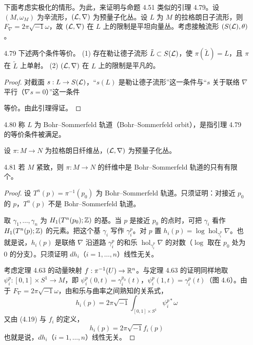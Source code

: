 下面考虑实极化的情形。为此，来证明与命题 4.51 类似的引理 4.79。设 $(M,\omega_M)$ 为辛流形，$(\mathcal{L},\nabla)$ 为预量子化丛。设 $L$ 为 $M$ 的拉格朗日子流形，则 $F_\nabla=2\pi\sqrt{-1}\omega$，故 $(\mathcal{L},\nabla)$ 在 $L$ 上的限制是平坦向量丛。考虑接触流形 $(S(\mathcal{L}),\theta)$。

\begin{lemma*}{4.79}
  下述两个条件等价。
  (1) 存在勒让德子流形 $\tilde L\subset S(\mathcal{L})$，使 $\pi(\tilde L)=L$，且 $\pi$ 在 $\tilde L$ 上单射。
  (2) $(\mathcal{L},\nabla)$ 在 $L$ 上的限制是平凡的。
\end{lemma*}

\begin{proof}
  对截面 $s:L\to S(\mathcal{L})$，“$s(L)$ 是勒让德子流形”这一条件与“$s$ 关于联络 $\nabla$ 平行（$\nabla s=0$）”这一条件

  等价。由此引理得证。
\end{proof}

\begin{definition}{4.80}
  称 $L$ 为 Bohr–Sommerfeld 轨道（Bohr–Sommerfeld orbit），是指引理 4.79 的等价条件被满足。
\end{definition}

设 $\pi:M\to N$ 为拉格朗日纤维丛，$(\mathcal{L},\nabla)$ 为预量子化丛。

\begin{lemma*}{4.81}
  若 $M$ 紧致，则 $\pi:M\to N$ 的纤维中是 Bohr–Sommerfeld 轨道的只有有限个。
\end{lemma*}

\begin{proof}
  设 $T^n(p)=\pi^{-1}(p_0)$ 为 Bohr–Sommerfeld 轨道。只须证明：对接近 $p_0$ 的 $p$，$T^n(p)$ 不是 Bohr–Sommerfeld 轨道。

  取 $\gamma_1,\dots,\gamma_n$ 为 $H_1(T^n(p_0);\mathbb{Z})$ 的基。当 $p$ 是接近 $p_0$ 的点时，可把 $\gamma_i$ 看作 $H_1(T^n(p);\mathbb{Z})$ 的元素。把这个基 $\gamma_i$ 写作 $\gamma^p_i$。对 $p$ 置 $h_i(p)=\log\operatorname{hol}_{\gamma^p_i}\nabla$。也就是说，$h_i(p)$ 是联络 $\nabla$ 沿道路 $\gamma^p_i$ 的和乐 $\operatorname{hol}_{\gamma^p_i}\nabla$ 的对数（$\log$ 取在 $p_0$ 处为 0 的分支）。只须证明 $dh_i$（$i=1,\dots,n$）线性无关。

  考虑定理 4.63 的动量映射 $f:\pi^{-1}(U)\to\mathbb{R}^n$。与定理 4.63 的证明同样地取 $\psi^p_i:[0,1]\times S^1\to M$，即 $\psi^p_i(0,t)=\gamma^{p_0}_i(t)$，$\psi^p_i(1,t)=\gamma^p_i(t)$（图 4.6）。由于 $F_\nabla=2\pi\sqrt{-1}\omega$，由和乐与曲率之间熟知的关系式，
  \begin{equation}
    h_i(p)=2\pi\sqrt{-1}\int_{[0,1]\times S^1}\psi^{p*}_i\omega \tag{4.19}
  \end{equation}
  又由 (4.19) 与 $f_i$ 的定义，
  \begin{equation}
    h_i(p)=2\pi\sqrt{-1}f_i(p) \tag{4.20}
  \end{equation}
  也就是说，$dh_i$（$i=1,\dots,n$）线性无关。
\end{proof}

